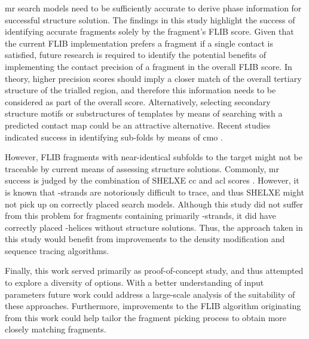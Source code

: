 \Gls{mr} search models need to be sufficiently accurate to derive phase information for successful structure solution. The findings in this study highlight the success of identifying accurate fragments solely by the fragment's FLIB score. Given that the current FLIB implementation prefers a fragment if a single contact is satisfied, future research is required to identify the potential benefits of implementing the contact precision of a fragment in the overall FLIB score. In theory, higher precision scores should imply a closer match of the overall tertiary structure of the trialled region, and therefore this information needs to be considered as part of the overall score. Alternatively, selecting secondary structure motifs or substructures of templates by means of searching with a predicted contact map could be an attractive alternative. Recent studies indicated success in identifying sub-folds by means of \gls{cmo} \cite{Buchan2017-sy,Ovchinnikov2017-ma}.

However, FLIB fragments with near-identical subfolds to the target might not be traceable by current means of assessing structure solutions. Commonly, \gls{mr} success is judged by the combination of SHELXE \gls{cc} and \gls{acl} scores \cite{Thorn2013-ir}. However, it is known that \textbeta-strands are notoriously difficult to trace, and thus SHELXE might not pick up on correctly placed search models. Although this study did not suffer from this problem for fragments containing primarily \textbeta-strands, it did have correctly placed \textalpha-helices without structure solutions. Thus, the approach taken in this study would benefit from improvements to the density modification and sequence tracing algorithms.

Finally, this work served primarily as proof-of-concept study, and thus attempted to explore a diversity of options. With a better understanding of input parameters future work could address a large-scale analysis of the suitability of these approaches. Furthermore, improvements to the FLIB algorithm originating from this work could help tailor the fragment picking process to obtain more closely matching fragments.
